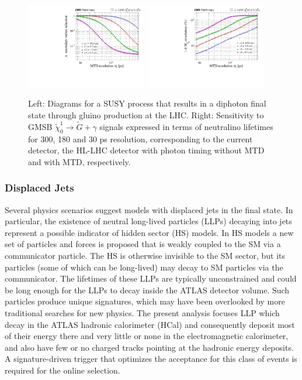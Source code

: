 \begin{figure}[hbtp]\begin{center}
\includegraphics[width=0.47\textwidth]{figures/MTD/171025_52.pdf}
\includegraphics[width=0.47\textwidth]{figures/MTD/171025_53.pdf}
\caption{ 
Left: Diagrams for a SUSY process that results in a diphoton final state through gluino production at the LHC. 
Right: Sensitivity to GMSB $\tilde{\chi}_0^1 \to \tilde{G} + \gamma$ signals expressed in
terms of neutralino lifetimes for 300, 180 and 30 ps resolution, corresponding to the current
detector, the HL-LHC detector with photon timing without MTD and with MTD, respectively.
}
\label{fig:cmsupgrade_photon}
\end{center}
\end{figure}


\subsubsection{Displaced Jets}

Several physics scenarios suggest models with displaced jets in the final state.  In particular, the existence of neutral long-lived particles (LLPs) decaying into jets represent a possible indicator of hidden sector (HS) models. In HS models a new set of particles and forces is proposed that is weakly coupled to the SM via a communicator particle. The HS is otherwise invisible to the SM sector, but its particles (some of which can be long-lived) may decay to SM particles via the communicator. The lifetimes of these LLPs are typically unconstrained and could be long enough for the LLPs to decay inside the ATLAS detector volume.
Such particles produce unique signatures, which may have been overlooked by more traditional searches for new physics.
The present analysis focuses LLP which decay in the ATLAS hadronic calorimeter (HCal) and consequently deposit most of their energy there and very little or none in the electromagnetic calorimeter, and also have few or no charged tracks pointing at the hadronic energy deposits. A signature-driven trigger that optimizes the acceptance for this class of events is required for the online selection. 

